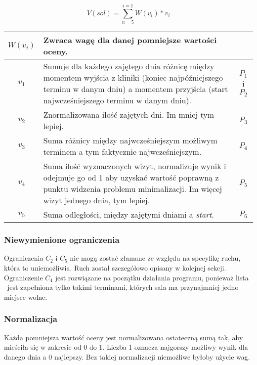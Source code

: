\begin{equation}
	V(sol) = \sum_{n=5}^{i=1} W(v_i) * v_i
\end{equation}

\begin{table}[h]
	\begin{tabularx}{\textwidth}{ | C{0.4} | L{2.3} | C{0.3} | }
		\hline
		$W(v_i)$ &  Zwraca wagę dla danej pomniejsze wartości oceny. &  \\
		\hline
		$v_1$ & Sumuje dla każdego zajętego dnia różnicę między momentem wyjścia z
		kliniki (koniec najpóźniejszego terminu w danym dniu) a momentem
		przyjścia (start najwcześniejszego terminu w danym
		dniu). & $P_1$ i $P_2$ \\
		\hline
		$v_2$ & Znormalizowana ilość zajętych dni. Im mniej tym lepiej. & $P_3$\\
		\hline
		$v_3$ & Suma różnicy między
		najwcześniejszym możliwym terminem a tym faktycznie
		najwcześniejszym. & $P_4$\\
		\hline
		$v_4$ & Suma ilość wyznaczonych
		wizyt, normalizuje wynik i odejmuje go od 1 aby uzyskać wartość
		poprawną z punktu widzenia problemu minimalizacji. Im więcej
		wizyt jednego dnia, tym lepiej. &
		$P_5$\\
		\hline
		$v_5$ & Suma odległości, między zajętymi dniami a \emph{start}.& $P_6$\\
		\hline
\end{tabularx}
\end{table}


\subsubsection{Niewymienione ograniczenia}
Ograniczenia $C_2$ i $C_5$ nie mogą zostać złamane ze względu na specyfikę
ruchu, która to uniemożliwia. Ruch został szczegółowo opisany w kolejnej sekcji.
Ograniczenie $C_4$ jest rozwiązane na początku działania programu, ponieważ
lista \sTermsList\ jest zapełniona tylko takimi terminami, których sala ma
przynajmniej jedno miejsce wolne.

\subsubsection{Normalizacja} 
Każda pomniejsza wartość oceny jest normalizowana ostateczną sumą tak, aby mieściła się w
zakresie od 0 do 1. Liczba 1 oznacza najgorszy możliwy wynik dla
danego dnia a 0 najlepszy. Bez takiej normalizacji niemożliwe byłoby użycie wag.

